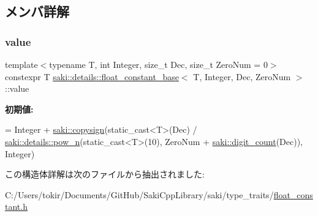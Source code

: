 \subsection{メンバ詳解}
\mbox{\label{structsaki_1_1details_1_1float__constant__base_a7c1fcb103a7419a7812cf095f1ffff61}} 
\subsubsection{\texorpdfstring{value}{value}}
{\footnotesize\ttfamily template$<$typename T, int Integer, size\+\_\+t Dec, size\+\_\+t Zero\+Num = 0$>$ \\
constexpr T \mbox{\hyperlink{structsaki_1_1details_1_1float__constant__base}{saki\+::details\+::float\+\_\+constant\+\_\+base}}$<$ T, Integer, Dec, Zero\+Num $>$\+::value\hspace{0.3cm}{\ttfamily [static]}}

{\bfseries 初期値\+:}
\begin{DoxyCode}
= Integer +
                \mbox{\hyperlink{namespacesaki_a8bab6303ac2144b883080f04ebe26a0e}{saki::copysign}}(static\_cast<T>(Dec) / 
                    \mbox{\hyperlink{namespacesaki_1_1details_a30b4cd78c970618ee2886123c28e4041}{saki::details::pow\_n}}(static\_cast<T>(10), ZeroNum + 
      \mbox{\hyperlink{namespacesaki_a467dee57b7bbe101146713a82acfe95e}{saki::digit\_count}}(Dec)),
                    Integer)
\end{DoxyCode}


この構造体詳解は次のファイルから抽出されました\+:\begin{DoxyCompactItemize}
\item 
C\+:/\+Users/tokir/\+Documents/\+Git\+Hub/\+Saki\+Cpp\+Library/saki/type\+\_\+traits/\mbox{\hyperlink{float__constant_8h}{float\+\_\+constant.\+h}}\end{DoxyCompactItemize}
